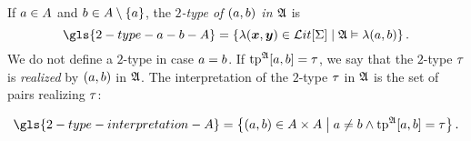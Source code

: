 If $a\in A$ and $b\in A\setminus\left\{a\right\}$, the \emph{$2$-type of $(a,
b)$ in $\mathfrak{A}$} is
\[
  \gls{2-type-a-b-A} = \setbd{\litl(\xx,\yy) \in \LitF\SigS}{\StrA \vDash
  \litl(\ea, \eb)}.
\]
We do not define a $2$-type in case $a = b$.
If $\operatorname{tp}^{\mathfrak{A}}[a,b] = \tau$, we say that the $2$-type $\tau$ is
\emph{realized} by $(a, b)$ in $\mathfrak{A}$. The interpretation of the $2$-type
$\tau$ in $\mathfrak{A}$ is the set of pairs realizing $\tau$:

\[
  \gls{2-type-interpretation-A} = \setbd{(\ea, \eb) \in
  \domA\cprod\domA}{\ea \neq \eb \land \tpIab\StrA\ea\eb = \tpTt}.
\]